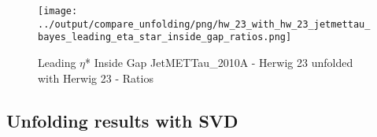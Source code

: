 \documentclass[11pt]{book}
\begin{document}
\begin{figure}[ht]
\centering
\texttt{[image: ../output/compare\_unfolding/png/hw\_23\_with\_hw\_23\_jetmettau\_bayes\_leading\_eta\_star\_inside\_gap\_ratios.png]}
\caption{Leading $\eta$* Inside Gap JetMETTau\_2010A - Herwig 23 unfolded with Herwig 23 - Ratios}
\label{hw_23_hw_23_jetmettau_bayes_leading_eta_star_inside_gap_b}
\end{figure}

\clearpage
\subsection{Unfolding results with SVD}


\begin{comment}

\begin{figure}[ht]
\centering
\texttt{[image: ../output/check\_response/png/pythia6\_z2\_jetmettau\_leading\_eta\_star\_inside\_gap\_response.png]}
\caption{Leading $\eta$* inside gap JetMETTau\_2010A - Pythia 6 Z2* response matrix}
\label{p6_jetmettau_leading_eta_star_inside_gap_response}
\end{figure}

\begin{figure}[ht]
\centering
\texttt{[image: ../output/check\_response/png/pythia6\_z2\_jetmettau\_leading\_eta\_star\_inside\_gap\_response\_norm.png]}
\caption{Leading $\eta$* inside gap JetMETTau\_2010A - Pythia 6 Z2* response matrix normalized}
\label{p6_jetmettau_leading_eta_star_inside_gap_response_norm}
\end{figure}

\begin{figure}[ht]
\centering
\texttt{[image: ../output/check\_response/png/pythia6\_z2\_jetmettau\_leading\_eta\_star\_inside\_gap\_response\_all.png]}
\caption{Leading $\eta$* inside gap JetMETTau\_2010A - Pythia 6 Z2* response matrix with fakes and miss}
\label{p6_jetmettau_leading_eta_star_inside_gap_response_all}
\end{figure}

\begin{figure}[ht]
\centering
\texttt{[image: ../output/check\_response/png/pythia6\_z2\_jetmettau\_leading\_eta\_star\_inside\_gap\_response\_all\_norm.png]}
\caption{Leading $\eta$* inside gap JetMETTau\_2010A - Pythia 6 Z2* response matrix with fakes and miss normalized}
\label{p6_jetmettau_leading_eta_star_inside_gap_response_all_norm}
\end{figure}


\end{comment}
\end{document}
